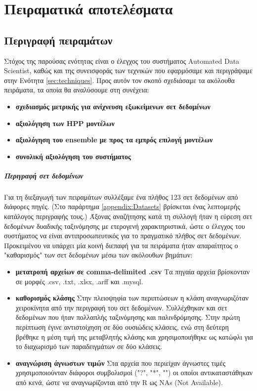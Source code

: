 \chapter{Πειραματικά αποτελέσματα}
\section{Περιγραφή πειραμάτων}
Στόχος της παρούσας ενότητας είναι ο έλεγχος του συστήματος Automated Data Scientist, καθώς και της συνεισφοράς των τεχνικών που εφαρμόσαμε και περιγράψαμε στην Ενότητα \ref{sec:techniques}. Προς αυτόν τον σκοπό σχεδιάσαμε τα ακόλουθα πειράματα, τα οποία θα αναλύσουμε στη συνέχεια:
\begin{itemize}
	\item \textbf{σχεδιασμός μετρικής για ανίχνευση εξωκείμενων σετ δεδομένων}
	\item \textbf{αξιολόγηση των HPP μοντέλων}
	\item \textbf{αξιολόγηση του ensemble με προς τα εμπρός επιλογή μοντέλων}
	\item \textbf{συνολική αξιολόγηση του συστήματος}
\end{itemize}

\paragraph{Περιγραφή σετ δεδομένων} Για τη διεξαγωγή των πειραμάτων συλλέξαμε ένα πλήθος 123 σετ δεδομένων από διάφορες πηγές. (Στο παράρτημα \ref{appendix:Datasets} βρίσκεται ένας λεπτομερής κατάλογος περιγραφής τους.) Άξονας αναζήτησης κατά τη συλλογή ήταν η εύρεση σετ δεδομένων δυαδικής ταξινόμησης με ετερογενή χαρακτηριστικά, ώστε ο έλεγχος του συστήματος να είναι αντιπροσωπευτικός για το πραγματικό πλήθος σετ δεδομένων. Προκειμένου να υπάρχει μία κοινή διεπαφή για τα πειράματα ήταν απαραίτητος ο "καθαρισμός" των σετ δεδομένων μέσω των ακόλουθων βημάτων:
\begin{itemize}
	\item \textbf{μετατροπή αρχείων σε comma-delimited .csv} Τα πηγαία αρχεία βρίσκονταν σε μορφές .csv, .txt, .xlsx, .arff και .mysql.
	\item \textbf{καθορισμός κλάσης} Στην πλειοψηφία των περιπτώσεων η κλάση αναγνωριζόταν χειροκίνητα από την περιγραφή του σετ δεδομένων. Συλλέχθηκαν και σετ δεδομένων που ήταν πολλαπλής ταξινόμησης και παλινδρόμησης. Στην πρώτη περίπτωση έγινε αντιστοίχηση σε δύο ουσιώδεις κλάσεις, ενώ στη δεύτερη βρέθηκε η μέση τιμή της μεταβλητής κλάσης και χρησιμοποιήθηκε ως κατώφλι για το διαχωρισμό των παραδειγμάτων σε δύο κλάσεις.
	\item \textbf{αναγνώριση άγνωστων τιμών} Στα αρχεία που περιείχαν άγνωστες τιμές χρησιμοποιούνταν διάφοροι συμβολισμοί ("?", "*", "") οι οποίοι αντικαταστάθηκαν από κενά, ώστε να αναγνωρίζονται από την R ως NAs (Not Available).  
\end{itemize}
